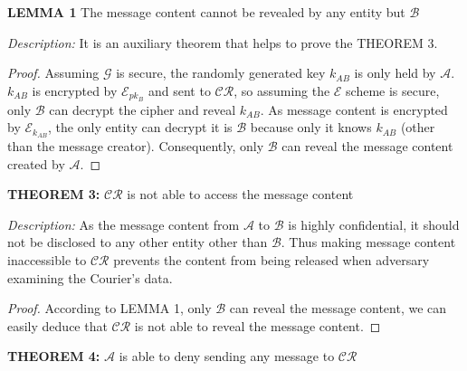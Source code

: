 \vspace{1cm}
\noindent
\textbf{LEMMA 1} The message content cannot be revealed by any entity but $\mathcal{B}$ 

\bigskip
\noindent
\textit{Description: }It is an auxiliary theorem that helps to prove the THEOREM 3.

\begin{proof}
Assuming $\mathcal{G}$ is secure, the randomly generated key $k_{AB}$ is only held by $\mathcal{A}$. $k_{AB}$ is encrypted by $\mathcal{E}_{pk_B}$ and sent to $\mathcal{CR}$, so assuming the $\mathcal{E}$ scheme is secure, only $\mathcal{B}$ can decrypt the cipher and reveal $k_{AB}$. As message content is encrypted by $\mathcal{E}_{k_{AB}}$, the only entity can decrypt it is $\mathcal{B}$ because only it knows $k_{AB}$ (other than the message creator). Consequently, only $\mathcal{B}$ can reveal the message content created by $\mathcal{A}$.
\end{proof}

\noindent
\textbf{THEOREM 3:} $\mathcal{CR}$ is not able to access the message content

\bigskip
\noindent
\textit{Description: }As the message content from $ \mathcal{A} $ to $ \mathcal{B} $ is highly confidential, it should not be disclosed to any other entity other than $ \mathcal{B} $. Thus making message content inaccessible to $ \mathcal{CR} $ prevents the content from being released when adversary examining the Courier's data.

\begin{proof}
According to LEMMA 1, only $\mathcal{B}$ can reveal the message content, we can easily deduce that $\mathcal{CR}$ is not able to reveal the message content.
\end{proof}

\vspace{1cm}
\noindent
\textbf{THEOREM 4:} $\mathcal{A}$ is able to deny sending any message to $\mathcal{CR}$

